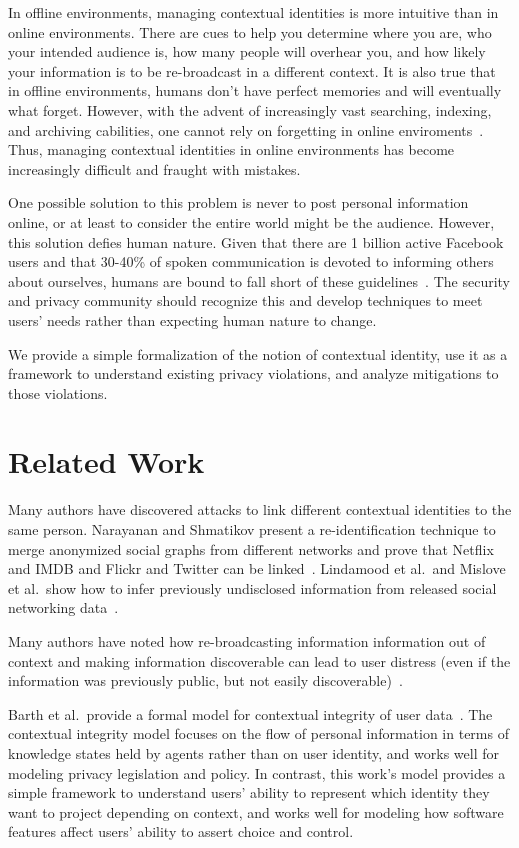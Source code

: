 \documentclass{llncs}
\begin{document}
In offline environments, managing contextual identities is more intuitive than
in online environments. There are cues to help you determine where you are,
who your intended audience is, how many people will overhear you, and how
likely your information is to be re-broadcast in a different context. It is
also true that in offline environments, humans don't have perfect memories and
will eventually what forget.  However, with the advent of increasingly vast
searching, indexing, and archiving cabilities, one cannot rely on forgetting in
online enviroments~\cite{delete}. Thus, managing contextual identities in
online environments has become increasingly difficult and fraught with
mistakes.

One possible solution to this problem is never to post personal information
online, or at least to consider the entire world might be the audience.
However, this solution defies human nature. Given that there are 1 billion
active Facebook users and that 30-40\% of spoken communication is devoted to
informing others about ourselves, humans are bound to fall short of these
guidelines~\cite{tamir,fbusers}. The security and privacy community should
recognize this and develop techniques to meet users' needs rather than
expecting human nature to change.

We provide a simple formalization of the notion of contextual identity, use it as a
framework to understand existing privacy violations, and analyze mitigations to
those violations.

\section{Related Work}

Many authors have discovered attacks to link different contextual identities to
the same person. Narayanan and Shmatikov present a re-identification technique
to merge anonymized social graphs from different networks and prove that
Netflix and IMDB and Flickr and Twitter can be
linked~\cite{narayanan1,narayanan2}. Lindamood et al.~and Mislove et al.~show
how to infer previously undisclosed information from released social networking
data~\cite{lindamood,mislove}.

Many authors have noted how re-broadcasting information information out of
context and making information discoverable can lead to user distress (even if
the information was previously public, but not easily
discoverable)~\cite{boyd1,chew,nissenbaum}.

Barth et al.~provide a formal model for contextual integrity of user
data~\cite{barth}. The contextual integrity model focuses on the flow of
personal information in terms of knowledge states held by agents rather than on
user identity, and works well for modeling privacy legislation and policy. In
contrast, this work's model provides a simple framework to understand users' ability
to represent which identity they want to project depending on context, and works
well for modeling how software features affect users' ability to assert choice
and control.
\end{document}
